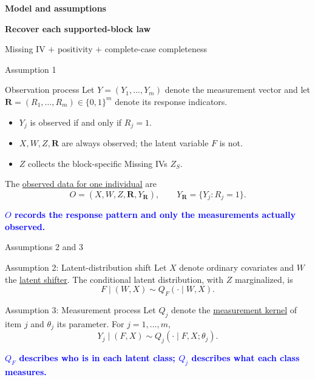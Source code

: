 \documentclass[aspectratio=169,10pt]{beamer}
\newcommand{\bluekey}[1]{\textcolor{Blue}{\textbf{#1}}}
\newcommand{\term}[1]{\underline{#1}}
\begin{document}
\begin{frame}[plain]
\vfill\centering
{\color{Blue}\large\bfseries Model and assumptions}\par\vspace{.6em}
{\fontsize{20}{24}\selectfont\bfseries Recover each supported-block law}\par\vspace{1em}
{\large Missing IV $+$ positivity $+$ complete-case completeness}
\vfill
\end{frame}

\begin{frame}{Assumption 1}
\begin{block}{Observation process}
Let $Y=(Y_1,\ldots,Y_m)$ denote the measurement vector and let
$\bm R=(R_1,\ldots,R_m)\in\{0,1\}^m$ denote its response indicators.
\begin{itemize}
  \item $Y_j$ is observed if and only if $R_j=1$.
  \item $X,W,Z,\bm R$ are always observed; the latent variable $F$ is not.
  \item $Z$ collects the block-specific Missing IVs $Z_S$.
\end{itemize}
The \term{observed data for one individual} are
\[
O=(X,W,Z,\bm R,Y_{\bm R}),\qquad Y_{\bm R}=\{Y_j:R_j=1\}.
\]
\end{block}
\bluekey{$O$ records the response pattern and only the measurements actually observed.}
\end{frame}

\begin{frame}{Assumptions 2 and 3}
\begin{block}{Assumption 2: Latent-distribution shift}
Let $X$ denote ordinary covariates and $W$ the \term{latent shifter}.
The conditional latent distribution, with $Z$ marginalized, is
\[
F\mid(W,X)\sim Q_F(\cdot\mid W,X).
\]
\end{block}
\begin{block}{Assumption 3: Measurement process}
Let $Q_j$ denote the \term{measurement kernel} of item $j$ and
$\theta_j$ its parameter. For $j=1,\ldots,m$,
\[
Y_j\mid(F,X)\sim Q_j(\cdot\mid F,X;\theta_j).
\]
\end{block}
\bluekey{$Q_F$ describes who is in each latent class; $Q_j$ describes what each class measures.}
\end{frame}
\end{document}
